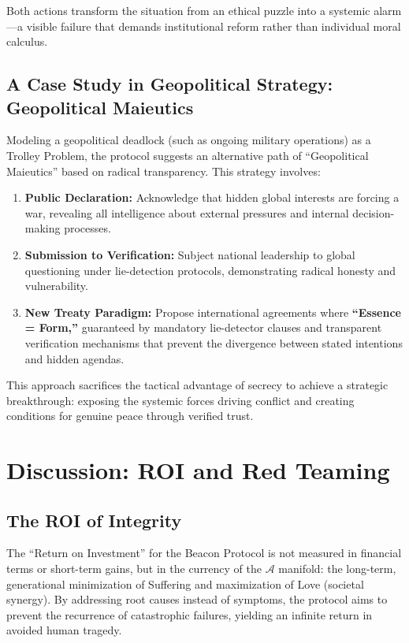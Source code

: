 \documentclass[11pt,a4paper]{article}
\begin{document}
Both actions transform the situation from an ethical puzzle into a systemic alarm—a visible failure that demands institutional reform rather than individual moral calculus.

\subsection{A Case Study in Geopolitical Strategy: Geopolitical Maieutics}
Modeling a geopolitical deadlock (such as ongoing military operations) as a Trolley Problem, the protocol suggests an alternative path of ``Geopolitical Maieutics'' based on radical transparency. This strategy involves:

\begin{enumerate}
    \item \textbf{Public Declaration:} Acknowledge that hidden global interests are forcing a war, revealing all intelligence about external pressures and internal decision-making processes.
    
    \item \textbf{Submission to Verification:} Subject national leadership to global questioning under lie-detection protocols, demonstrating radical honesty and vulnerability.
    
    \item \textbf{New Treaty Paradigm:} Propose international agreements where \textbf{``Essence = Form,''} guaranteed by mandatory lie-detector clauses and transparent verification mechanisms that prevent the divergence between stated intentions and hidden agendas.
\end{enumerate}

This approach sacrifices the tactical advantage of secrecy to achieve a strategic breakthrough: exposing the systemic forces driving conflict and creating conditions for genuine peace through verified trust.

\section{Discussion: ROI and Red Teaming}
\subsection{The ROI of Integrity}
The ``Return on Investment'' for the Beacon Protocol is not measured in financial terms or short-term gains, but in the currency of the $\mathcal{A}$ manifold: the long-term, generational minimization of Suffering and maximization of Love (societal synergy). By addressing root causes instead of symptoms, the protocol aims to prevent the recurrence of catastrophic failures, yielding an infinite return in avoided human tragedy.
\end{document}
